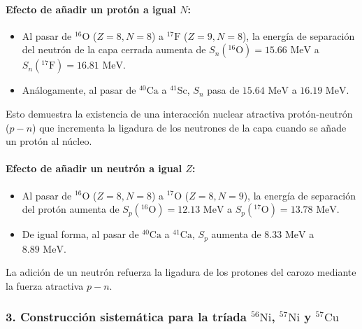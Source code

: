 \begin{problema}
\paragraph{Efecto de añadir un protón a igual $N$:}
\begin{itemize}
    \item Al pasar de ${}^{16}\text{O}$ ($Z=8, N=8$) a ${}^{17}\text{F}$ ($Z=9, N=8$), la energía de separación del neutrón de la capa cerrada aumenta de $S_n({}^{16}\text{O}) = 15.66\text{ MeV}$ a $S_n({}^{17}\text{F}) = 16.81\text{ MeV}$.
    \item Análogamente, al pasar de ${}^{40}\text{Ca}$ a ${}^{41}\text{Sc}$, $S_n$ pasa de $15.64\text{ MeV}$ a $16.19\text{ MeV}$.
\end{itemize}
Esto demuestra la existencia de una interacción nuclear atractiva protón-neutrón ($p-n$) que incrementa la ligadura de los neutrones de la capa cuando se añade un protón al núcleo.

\paragraph{Efecto de añadir un neutrón a igual $Z$:}
\begin{itemize}
    \item Al pasar de ${}^{16}\text{O}$ ($Z=8, N=8$) a ${}^{17}\text{O}$ ($Z=8, N=9$), la energía de separación del protón aumenta de $S_p({}^{16}\text{O}) = 12.13\text{ MeV}$ a $S_p({}^{17}\text{O}) = 13.78\text{ MeV}$.
    \item De igual forma, al pasar de ${}^{40}\text{Ca}$ a ${}^{41}\text{Ca}$, $S_p$ aumenta de $8.33\text{ MeV}$ a $8.89\text{ MeV}$.
\end{itemize}
La adición de un neutrón refuerza la ligadura de los protones del carozo mediante la fuerza atractiva $p-n$.

\subsubsection*{3. Construcción sistemática para la tríada ${}^{56}\text{Ni}$, ${}^{57}\text{Ni}$ y ${}^{57}\text{Cu}$}


\end{problema}
